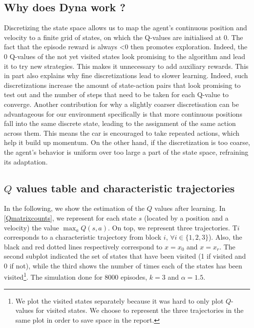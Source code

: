 \documentclass[a4paper, 12pt,oneside]{article}
\begin{document}
        \subsection{Why does Dyna work ?}
        Discretizing the state space allows us to map the agent's continuous position and velocity to a finite grid of states, on which the Q-values are initialised at 0. The fact that the episode reward is always <0 then promotes exploration. Indeed, the 0 Q-values of the not yet visited states look promising to the algorithm and lead it to try new strategies. This makes it unnecessary to add auxiliary rewards. This in part also explains why fine discretizations lead to slower learning. Indeed, such discretizations increase the amount of state-action pairs that look promising to test out and the number of steps that need to be taken for each Q-value to converge.
        Another contribution for why a slightly coarser discretisation can be advantageous for our environment specifically is that more continuous positions fall into the same discrete state, leading to the assignment of the same action across them. This means the car is encouraged to take repeated actions, which help it build up momentum. On the other hand, if the discretization is too coarse, the agent's behavior is uniform over too large a part of the state space, refraining its adaptation. 

        \subsection{$Q$ values table and characteristic trajectories}\label{sec:characteristic-trajectories}
        In the following, we show the estimation of the $Q$ values after learning. In \ref{Qmatrixcounts}, we represent for each state $s$ (located by a position and a velocity) the value $\max_a Q(s,a)$. On top, we represent three trajectories. T$i$ corresponds to a characteristic trajectory from block $i$, $\forall i \in \{1,2,3\}$). Also, the black and red dotted lines respectively correspond to $x=x_0$ and $x=x_r$. 
        The second subplot indicated the set of states that have been visited (1 if visited and 0 if not), while the third shows the number of times each of the states has been visited\footnote{We plot the visited states separately because it was hard to only plot $Q$-values for visited states. We choose to represent the three trajectories in the same plot in order to save space in the report.}. The simulation done for 8000 episodes, $k=3$ and $\alpha=1.5$.
        
\end{document}
